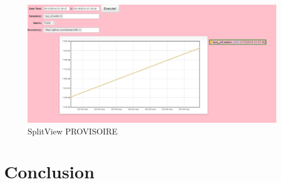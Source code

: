 \documentclass[a4paper,12pt]{article}
\begin{document}
\begin{figure}[!h]
	\centering
	\includegraphics[width=1\textwidth]{figures/graph1.png}
	\caption{SplitView PROVISOIRE}
	\label{fig:graph1}
\end{figure}




\section{Conclusion}

\appendix
{}

\end{document}
